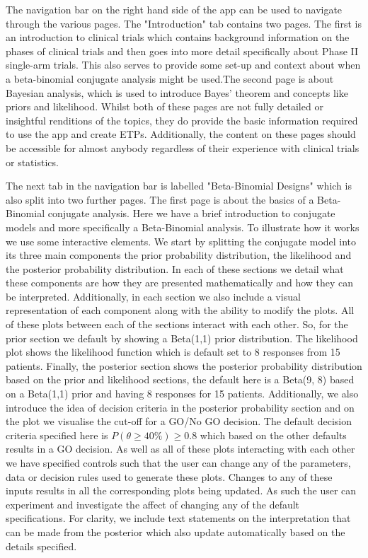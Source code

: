 The navigation bar on the right hand side of the app can be used to navigate through the various pages. The "Introduction" tab contains two pages. The first is an introduction to clinical trials which contains background information on the phases of clinical trials and then goes into more detail specifically about Phase \RN{2} single-arm trials. This also serves to provide some set-up and context about when a beta-binomial conjugate analysis might be used.The second page is about Bayesian analysis, which is used to introduce Bayes' theorem and concepts like priors and likelihood. Whilst both of these pages are not fully detailed or insightful renditions of the topics, they do provide the basic information required to use the app and create ETPs. Additionally, the content on these pages should be accessible for almost anybody regardless of their experience with clinical trials or statistics. 

The next tab in the navigation bar is labelled "Beta-Binomial Designs" which is also split into two further pages. The first page is about the basics of a Beta-Binomial conjugate analysis. Here we have a brief introduction to conjugate models and more specifically a Beta-Binomial analysis. To illustrate how it works we use some interactive elements. We start by splitting the conjugate model into its three main components the prior probability distribution, the likelihood and the posterior probability distribution.  In each of these sections we detail what these components are how they are presented mathematically and how they can be interpreted. Additionally, in each section we also include a visual representation of each component along with the ability to modify the plots. All of these plots between each of the sections interact with each other. So, for the prior section we default by showing a Beta(1,1) prior distribution. The likelihood plot shows the likelihood function which is default set to 8 responses from 15 patients. Finally, the posterior section shows the posterior probability distribution based on the prior and likelihood sections, the default here is a Beta(9, 8) based on a Beta(1,1) prior and having 8 responses for 15 patients. Additionally, we also introduce the idea of decision criteria in the posterior probability section and on the plot we visualise the cut-off for a GO/No GO decision. The default decision criteria specified here is $P(\theta  \geq 40\%) \geq 0.8$ which based on the other defaults results in a GO decision. As well as all of these plots interacting with each other we have specified controls such that the user can change any of the parameters, data or decision rules used to generate these plots. Changes to any of these inputs results in all the corresponding plots being updated. As such the user can experiment and investigate the affect of changing any of the default specifications. For clarity, we include text statements on the interpretation that can be made from the posterior which also update automatically based on the details specified.

